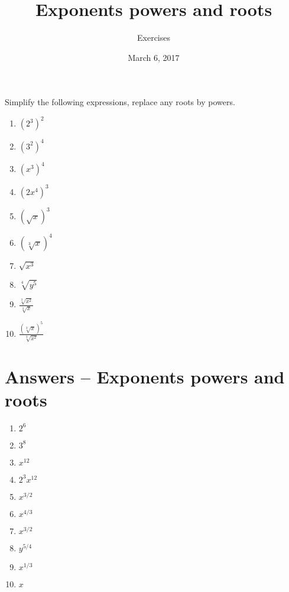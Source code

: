 \documentclass[11pt]{article}
\title{Exponents powers and roots}
\date{March 6, 2017}
\author{Exercises}
\begin{document}
\maketitle
Simplify the following expressions, replace any roots by powers.
\begin{enumerate}
	\item $(2^3)^2$
	\item $(3^2)^4$
	\item $(x^3)^4$
	\item $(2x^4)^3$
	\item $\left(\sqrt{x}\right)^3$
	\item $\left(\sqrt[3]{x}\right)^4$
	\item $\sqrt{x^3}$
	\item $\sqrt[4]{y^5}$
	\item $\displaystyle{\frac{\sqrt[3]{x^2}}{\sqrt[3]{x}}}$
	\item $\displaystyle{\frac{\left(\sqrt[3]{x}\right)^5} {\sqrt[3]{x^2}}}$
\end{enumerate}
\newpage
\section*{Answers -- Exponents powers and roots}
\begin{enumerate}
	\item $2^6$
	\item $3^8$
	\item $x^{12}$
	\item $2^3 x^{12}$
	\item $x^{3/2}$
	\item $x^{4/3}$
	\item $x^{3/2}$
	\item $y^{5/4}$
	\item $x^{1/3}$
	\item $x$
\end{enumerate}
\end{document}
